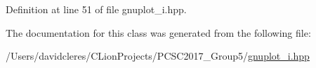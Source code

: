 Definition at line 51 of file gnuplot\+\_\+i.\+hpp.



The documentation for this class was generated from the following file\+:\begin{DoxyCompactItemize}
\item 
/\+Users/davidcleres/\+C\+Lion\+Projects/\+P\+C\+S\+C2017\+\_\+\+Group5/\mbox{\hyperlink{gnuplot__i_8hpp}{gnuplot\+\_\+i.\+hpp}}\end{DoxyCompactItemize}
